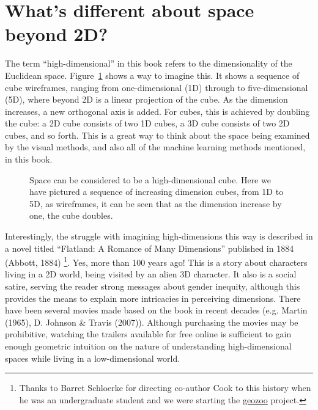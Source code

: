 \documentclass[
  letterpaper,
]{krantz}
\begin{document}
\section{What's different about space beyond
2D?}\label{whats-different-about-space-beyond-2d}

The term ``high-dimensional'' in this book refers to the dimensionality
of the Euclidean space. Figure~\ref{fig-dimension-cubes} shows a way to
imagine this. It shows a sequence of cube wireframes, ranging from
one-dimensional (1D) through to five-dimensional (5D), where beyond 2D
is a linear projection of the cube. As the dimension increases, a new
orthogonal axis is added. For cubes, this is achieved by doubling the
cube: a 2D cube consists of two 1D cubes, a 3D cube consists of two 2D
cubes, and so forth. This is a great way to think about the space being
examined by the visual methods, and also all of the machine learning
methods mentioned, in this book.


\begin{figure}


\caption{\label{fig-dimension-cubes}Space can be considered to be a
high-dimensional cube. Here we have pictured a sequence of increasing
dimension cubes, from 1D to 5D, as wireframes, it can be seen that as
the dimension increase by one, the cube doubles.}

\end{figure}%

Interestingly, the struggle with imagining high-dimensions this way is
described in a novel titled ``Flatland: A Romance of Many Dimensions''
published in 1884 (Abbott, 1884) \footnote{Thanks to Barret Schloerke
  for directing co-author Cook to this history when he was an
  undergraduate student and we were starting the
  \href{http://schloerke.com/geozoo/}{geozoo} project.}. Yes, more than
100 years ago! This is a story about characters living in a 2D world,
being visited by an alien 3D character. It also is a social satire,
serving the reader strong messages about gender inequity, although this
provides the means to explain more intricacies in perceiving dimensions.
There have been several movies made based on the book in recent decades
(e.g. Martin (1965), D. Johnson \& Travis (2007)). Although purchasing
the movies may be prohibitive, watching the trailers available for free
online is sufficient to gain enough geometric intuition on the nature of
understanding high-dimensional spaces while living in a low-dimensional
world.
\end{document}
